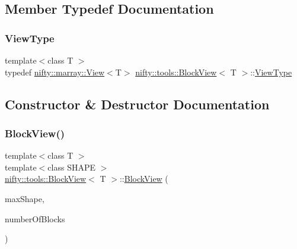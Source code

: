 \subsection{Member Typedef Documentation}
\mbox{\label{classnifty_1_1tools_1_1BlockView_acaadee9e8a7dc696acf1ebad24bd431d}} 
\subsubsection{\texorpdfstring{View\+Type}{ViewType}}
{\footnotesize\ttfamily template$<$class T $>$ \\
typedef \hyperlink{classandres_1_1View}{nifty\+::marray\+::\+View}$<$T$>$ \hyperlink{classnifty_1_1tools_1_1BlockView}{nifty\+::tools\+::\+Block\+View}$<$ T $>$\+::\hyperlink{classnifty_1_1tools_1_1BlockView_acaadee9e8a7dc696acf1ebad24bd431d}{View\+Type}}



\subsection{Constructor \& Destructor Documentation}
\mbox{\label{classnifty_1_1tools_1_1BlockView_a1b591e8f45f3bed139be4e0c3389120b}} 
\subsubsection{\texorpdfstring{Block\+View()}{BlockView()}\hspace{0.1cm}{\footnotesize\ttfamily [1/2]}}
{\footnotesize\ttfamily template$<$class T $>$ \\
template$<$class S\+H\+A\+PE $>$ \\
\hyperlink{classnifty_1_1tools_1_1BlockView}{nifty\+::tools\+::\+Block\+View}$<$ T $>$\+::\hyperlink{classnifty_1_1tools_1_1BlockView}{Block\+View} (\begin{DoxyParamCaption}\item[{const S\+H\+A\+PE \&}]{max\+Shape,  }\item[{const std\+::size\+\_\+t}]{number\+Of\+Blocks }\end{DoxyParamCaption})\hspace{0.3cm}{\ttfamily [inline]}}

